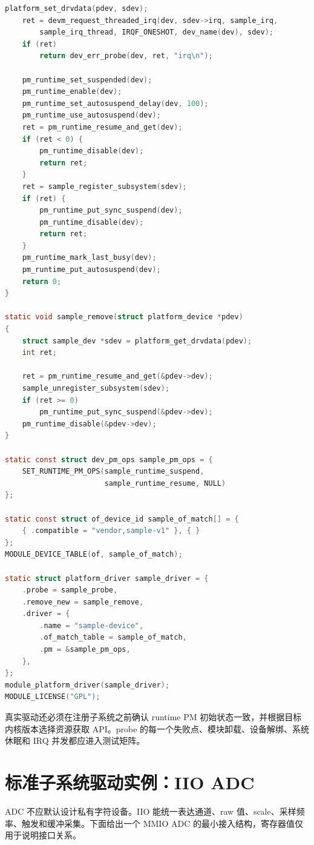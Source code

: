 \begin{lstlisting}[language=C,caption={带 runtime PM 的 platform driver 结构}]
    platform_set_drvdata(pdev, sdev);
    ret = devm_request_threaded_irq(dev, sdev->irq, sample_irq,
        sample_irq_thread, IRQF_ONESHOT, dev_name(dev), sdev);
    if (ret)
        return dev_err_probe(dev, ret, "irq\n");

    pm_runtime_set_suspended(dev);
    pm_runtime_enable(dev);
    pm_runtime_set_autosuspend_delay(dev, 100);
    pm_runtime_use_autosuspend(dev);
    ret = pm_runtime_resume_and_get(dev);
    if (ret < 0) {
        pm_runtime_disable(dev);
        return ret;
    }
    ret = sample_register_subsystem(sdev);
    if (ret) {
        pm_runtime_put_sync_suspend(dev);
        pm_runtime_disable(dev);
        return ret;
    }
    pm_runtime_mark_last_busy(dev);
    pm_runtime_put_autosuspend(dev);
    return 0;
}

static void sample_remove(struct platform_device *pdev)
{
    struct sample_dev *sdev = platform_get_drvdata(pdev);
    int ret;

    ret = pm_runtime_resume_and_get(&pdev->dev);
    sample_unregister_subsystem(sdev);
    if (ret >= 0)
        pm_runtime_put_sync_suspend(&pdev->dev);
    pm_runtime_disable(&pdev->dev);
}

static const struct dev_pm_ops sample_pm_ops = {
    SET_RUNTIME_PM_OPS(sample_runtime_suspend,
                       sample_runtime_resume, NULL)
};

static const struct of_device_id sample_of_match[] = {
    { .compatible = "vendor,sample-v1" }, { }
};
MODULE_DEVICE_TABLE(of, sample_of_match);

static struct platform_driver sample_driver = {
    .probe = sample_probe,
    .remove_new = sample_remove,
    .driver = {
        .name = "sample-device",
        .of_match_table = sample_of_match,
        .pm = &sample_pm_ops,
    },
};
module_platform_driver(sample_driver);
MODULE_LICENSE("GPL");
\end{lstlisting}

真实驱动还必须在注册子系统之前确认 runtime PM 初始状态一致，并根据目标内核版本选择资源获取 API。probe 的每一个失败点、模块卸载、设备解绑、系统休眠和 IRQ 并发都应进入测试矩阵。

\section{标准子系统驱动实例：IIO ADC}

ADC 不应默认设计私有字符设备。IIO 能统一表达通道、raw 值、scale、采样频率、触发和缓冲采集。下面给出一个 MMIO ADC 的最小接入结构，寄存器值仅用于说明接口关系。


